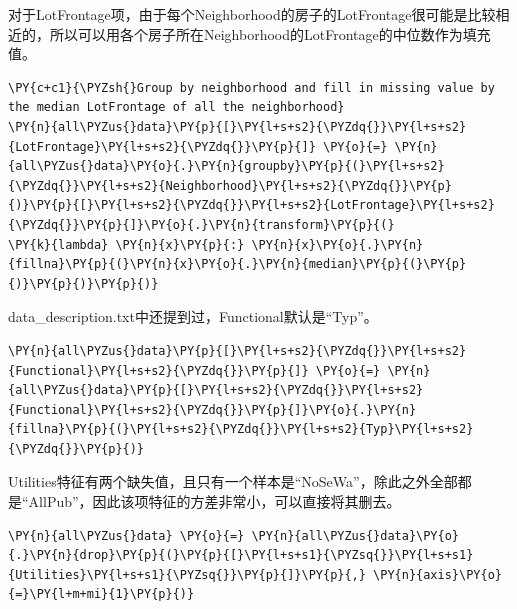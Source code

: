 \documentclass[no-math]{YangThesis}
\begin{document}
对于LotFrontage项，由于每个Neighborhood的房子的LotFrontage很可能是比较相近的，所以可以用各个房子所在Neighborhood的LotFrontage的中位数作为填充值。

\begin{tcolorbox}[breakable, size=fbox, boxrule=1pt, pad at break*=1mm,colback=cellbackground, colframe=cellborder]
	\begin{Verbatim}[commandchars=\\\{\}]
\PY{c+c1}{\PYZsh{}Group by neighborhood and fill in missing value by the median LotFrontage of all the neighborhood}
\PY{n}{all\PYZus{}data}\PY{p}{[}\PY{l+s+s2}{\PYZdq{}}\PY{l+s+s2}{LotFrontage}\PY{l+s+s2}{\PYZdq{}}\PY{p}{]} \PY{o}{=} \PY{n}{all\PYZus{}data}\PY{o}{.}\PY{n}{groupby}\PY{p}{(}\PY{l+s+s2}{\PYZdq{}}\PY{l+s+s2}{Neighborhood}\PY{l+s+s2}{\PYZdq{}}\PY{p}{)}\PY{p}{[}\PY{l+s+s2}{\PYZdq{}}\PY{l+s+s2}{LotFrontage}\PY{l+s+s2}{\PYZdq{}}\PY{p}{]}\PY{o}{.}\PY{n}{transform}\PY{p}{(}
\PY{k}{lambda} \PY{n}{x}\PY{p}{:} \PY{n}{x}\PY{o}{.}\PY{n}{fillna}\PY{p}{(}\PY{n}{x}\PY{o}{.}\PY{n}{median}\PY{p}{(}\PY{p}{)}\PY{p}{)}\PY{p}{)}
	\end{Verbatim}
\end{tcolorbox}

data\_description.txt中还提到过，Functional默认是``Typ''。

\begin{tcolorbox}[breakable, size=fbox, boxrule=1pt, pad at break*=1mm,colback=cellbackground, colframe=cellborder]
	\begin{Verbatim}[commandchars=\\\{\}]
\PY{n}{all\PYZus{}data}\PY{p}{[}\PY{l+s+s2}{\PYZdq{}}\PY{l+s+s2}{Functional}\PY{l+s+s2}{\PYZdq{}}\PY{p}{]} \PY{o}{=} \PY{n}{all\PYZus{}data}\PY{p}{[}\PY{l+s+s2}{\PYZdq{}}\PY{l+s+s2}{Functional}\PY{l+s+s2}{\PYZdq{}}\PY{p}{]}\PY{o}{.}\PY{n}{fillna}\PY{p}{(}\PY{l+s+s2}{\PYZdq{}}\PY{l+s+s2}{Typ}\PY{l+s+s2}{\PYZdq{}}\PY{p}{)}
	\end{Verbatim}
\end{tcolorbox}

Utilities特征有两个缺失值，且只有一个样本是``NoSeWa''，除此之外全部都是``AllPub''，因此该项特征的方差非常小，可以直接将其删去。

\begin{tcolorbox}[breakable, size=fbox, boxrule=1pt, pad at break*=1mm,colback=cellbackground, colframe=cellborder]
	\begin{Verbatim}[commandchars=\\\{\}]
\PY{n}{all\PYZus{}data} \PY{o}{=} \PY{n}{all\PYZus{}data}\PY{o}{.}\PY{n}{drop}\PY{p}{(}\PY{p}{[}\PY{l+s+s1}{\PYZsq{}}\PY{l+s+s1}{Utilities}\PY{l+s+s1}{\PYZsq{}}\PY{p}{]}\PY{p}{,} \PY{n}{axis}\PY{o}{=}\PY{l+m+mi}{1}\PY{p}{)}
	\end{Verbatim}
\end{tcolorbox}
\end{document}
